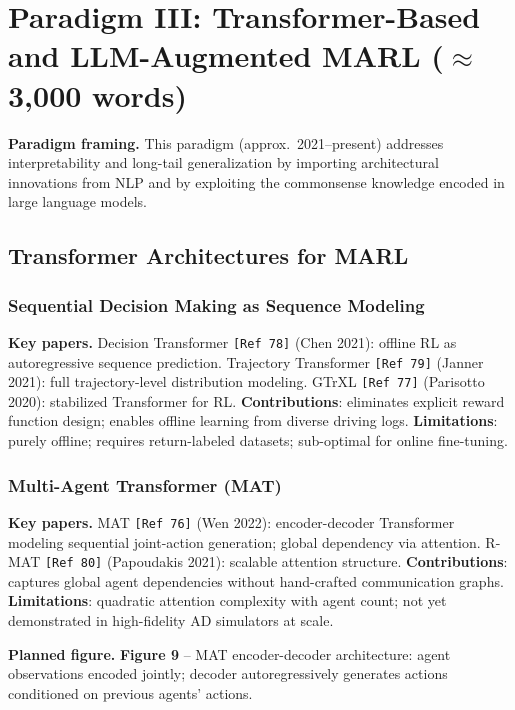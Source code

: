\documentclass[12pt, a4paper]{article}
\begin{document}
\section{Paradigm III: Transformer-Based and LLM-Augmented MARL \textnormal{\small ($\approx$3{,}000 words)}}
\label{sec:paradigm3}

\begin{outline_note}
\textbf{Paradigm framing.}
This paradigm (approx.\ 2021--present) addresses interpretability and
long-tail generalization by importing architectural innovations from NLP
and by exploiting the commonsense knowledge encoded in large language models.
\end{outline_note}

\subsection{Transformer Architectures for MARL}

\subsubsection{Sequential Decision Making as Sequence Modeling}

\begin{outline_note}
\textbf{Key papers.}
Decision Transformer \texttt{[Ref\,78]} (Chen 2021): offline RL as
autoregressive sequence prediction.
Trajectory Transformer \texttt{[Ref\,79]} (Janner 2021): full
trajectory-level distribution modeling.
GTrXL \texttt{[Ref\,77]} (Parisotto 2020): stabilized Transformer for RL.
\textbf{Contributions}: eliminates explicit reward function design;
enables offline learning from diverse driving logs.
\textbf{Limitations}: purely offline; requires return-labeled datasets;
sub-optimal for online fine-tuning.
\end{outline_note}

\subsubsection{Multi-Agent Transformer (MAT)}

\begin{outline_note}
\textbf{Key papers.}
MAT \texttt{[Ref\,76]} (Wen 2022): encoder-decoder Transformer modeling
sequential joint-action generation; global dependency via attention.
R-MAT \texttt{[Ref\,80]} (Papoudakis 2021): scalable attention structure.
\textbf{Contributions}: captures global agent dependencies without
hand-crafted communication graphs.
\textbf{Limitations}: quadratic attention complexity with agent count;
not yet demonstrated in high-fidelity AD simulators at scale.

\textbf{Planned figure.}
\textbf{Figure 9} -- MAT encoder-decoder architecture: agent
observations encoded jointly; decoder autoregressively generates
actions conditioned on previous agents' actions.
\end{outline_note}
\end{document}
